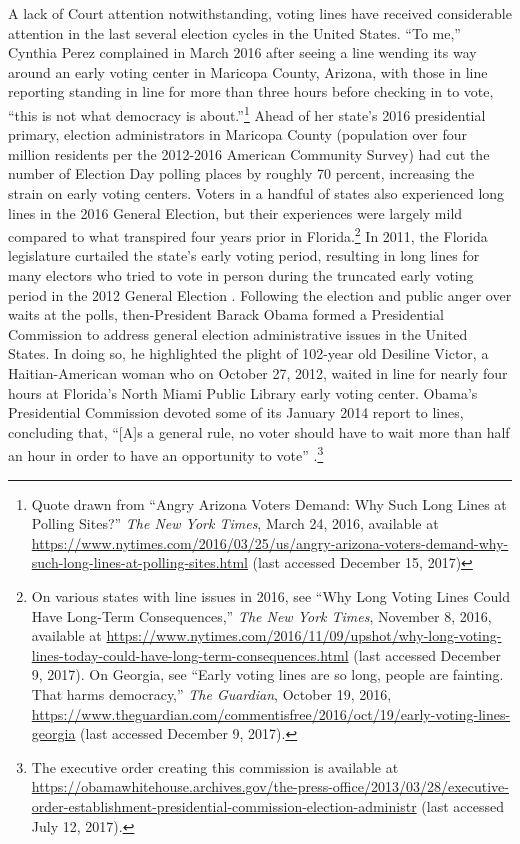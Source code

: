 \documentclass[12pt,titlepage]{article}
\begin{document}
A lack of Court attention notwithstanding, voting lines have received
considerable attention in the last several election cycles in the
United States.  ``To me,'' Cynthia Perez complained in March 2016
after seeing a line wending its way around an early voting center in
Maricopa County, Arizona, with those in line reporting standing in
line for more than three hours before checking in to vote, ``this is
not what democracy is about.''\footnote{Quote drawn from ``Angry
  Arizona Voters Demand: Why Such Long Lines at Polling Sites?''
  \emph{The New York Times}, March 24, 2016, available at
  \url{https://www.nytimes.com/2016/03/25/us/angry-arizona-voters-demand-why-such-long-lines-at-polling-sites.html}
  (last accessed December 15, 2017)} Ahead of her state's 2016
presidential primary, election administrators in Maricopa County
(population over four million residents per the 2012-2016 American
Community Survey) had cut the number of Election Day polling places by
roughly 70 percent, increasing the strain on early voting centers.
Voters in a handful of states also experienced long lines in the 2016
General Election, but their experiences were largely mild compared to
what transpired four years prior in Florida.\footnote{On various
  states with line issues in 2016, see ``Why Long Voting Lines Could
  Have Long-Term Consequences,'' \emph{The New York Times}, November
  8, 2016, available at
  \url{https://www.nytimes.com/2016/11/09/upshot/why-long-voting-lines-today-could-have-long-term-consequences.html}
  (last accessed December 9, 2017).  On Georgia, see ``Early voting
  lines are so long, people are fainting. That harms democracy,''
  \emph{The Guardian}, October 19, 2016,
  \url{https://www.theguardian.com/commentisfree/2016/oct/19/early-voting-lines-georgia}
  (last accessed December 9, 2017).} In 2011, the Florida legislature
curtailed the state's early voting period, resulting in long lines for
many electors who tried to vote in person during the truncated early
voting period in the 2012 General Election
\citep{herron_smith2014}. Following the election and public anger over
waits at the polls, then-President Barack Obama formed a Presidential
Commission to address general election administrative issues in the
United States. In doing so, he highlighted the plight of 102-year old
Desiline Victor, a Haitian-American woman who on October 27, 2012,
waited in line for nearly four hours at Florida's North Miami Public
Library early voting center. Obama's Presidential Commission devoted
some of its January 2014 report to lines, concluding that, ``[A]s a
general rule, no voter should have to wait more than half an hour in
order to have an opportunity to vote'' \citep[p.\
13,][]{pcea:2014}.\footnote{The executive order creating this
  commission is available at
  \url{https://obamawhitehouse.archives.gov/the-press-office/2013/03/28/executive-order-establishment-presidential-commission-election-administr}
  (last accessed July 12, 2017).}
\end{document}

